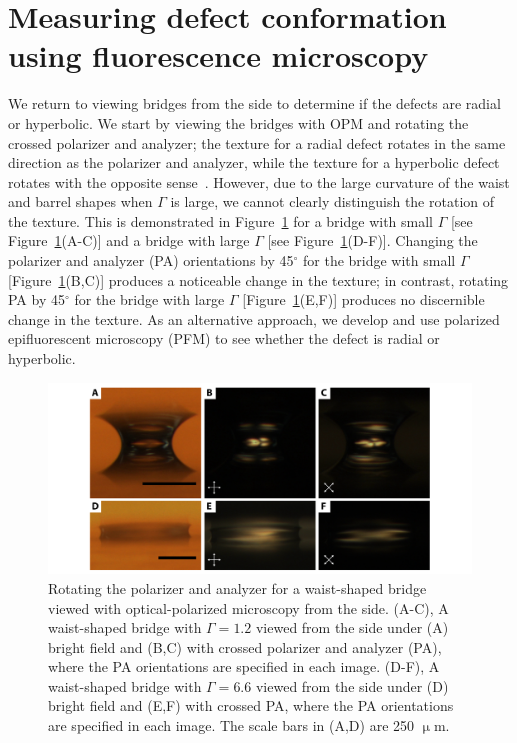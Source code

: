 \section{Measuring defect conformation using fluorescence microscopy}
We return to viewing bridges from the side to determine if the defects are radial or hyperbolic.
We start by viewing the bridges with OPM and rotating the crossed polarizer and analyzer; the texture for a radial defect rotates in the same direction as the polarizer and analyzer, while the texture for a hyperbolic defect rotates with the opposite sense~\cite{RN177}.
However, due to the large curvature of the waist and barrel shapes when $\Gamma$ is large, we cannot clearly distinguish the rotation of the texture.
This is demonstrated in Figure~\ref{f:5-PA_Rot} for a bridge with small $\Gamma$ [see Figure~\ref{f:5-PA_Rot}(A-C)] and a bridge with large $\Gamma$ [see Figure~\ref{f:5-PA_Rot}(D-F)].
Changing the polarizer and analyzer (PA) orientations by 45$^{\circ}$ for the bridge with small $\Gamma$ [Figure~\ref{f:5-PA_Rot}(B,C)] produces a noticeable change in the texture; in contrast, rotating PA by 45$^{\circ}$ for the bridge with large $\Gamma$ [Figure~\ref{f:5-PA_Rot}(E,F)] produces no discernible change in the texture.
As an alternative approach, we develop and use polarized epifluorescent microscopy (PFM) to see whether the defect is radial or hyperbolic.
\begin{figure}
  \centering
  \includegraphics{figures/C5/Ch5-Figs_PA_Rot.png}
  \caption{Rotating the polarizer and analyzer for a waist-shaped bridge viewed with optical-polarized microscopy from the side.
  (A-C), A waist-shaped bridge with $\Gamma = 1.2$ viewed from the side under (A) bright field and (B,C) with crossed polarizer and analyzer (PA), where the PA orientations are specified in each image.
  (D-F), A waist-shaped bridge with $\Gamma = 6.6$ viewed from the side under (D) bright field and (E,F) with crossed PA, where the PA orientations are specified in each image.
  The scale bars in (A,D) are 250 $\upmu$m.}\label{f:5-PA_Rot}
\end{figure}

